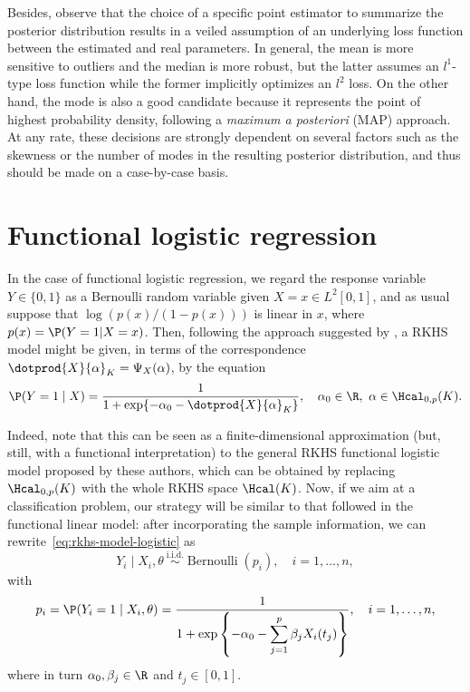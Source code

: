Besides, observe that the choice of a specific point estimator to summarize the posterior distribution results in a veiled assumption of an underlying loss function between the estimated and real parameters. In general, the mean is more sensitive to outliers and the median is more robust, but the latter assumes an \(l^1\)-type loss function while the former implicitly optimizes an \(l^2\) loss. On the other hand, the mode is also a good candidate because it represents the point of highest probability density, following a \textit{maximum a posteriori} (MAP) approach. At any rate, these decisions are strongly dependent on several factors such as the skewness or the number of modes in the resulting posterior distribution, and thus should be made on a case-by-case basis.

\newpage

\section{Functional logistic regression}\label{sec:rkhs-logistic-model}

In the case of functional logistic regression, we regard the response variable \(Y\in\{0, 1\}\) as a Bernoulli random variable given \(X=x \in L^2[0, 1]\), and as usual suppose that \(\log\left(p(x)/(1-p(x))\right)\) is linear in \(x\), where \(p(x)=\P(Y=1| X=x)\). Then, following the approach  suggested by \citet{berrendero2018functional}, a RKHS model might be given, in terms of the correspondence \(\dotprod{X}{\alpha}_K = \Psi_X(\alpha)\), by the equation
\begin{equation}\label{eq:rkhs-model-logistic}
  \P(Y=1 \mid X) = \frac{1}{1 + \exp\{-\alpha_0 - \dotprod{X}{\alpha}_K\}}, \quad \alpha_0 \in \R, \ \alpha \in \Hcal_{0,p}(K).
\end{equation}

Indeed, note that this can be seen as a finite-dimensional approximation (but, still, with a functional interpretation) to the general RKHS functional logistic model proposed by these authors, which can be obtained by replacing \(\Hcal_{0,p}(K)\) with the whole RKHS space \(\Hcal(K)\). Now, if we aim at a classification problem, our strategy will be similar to that followed in the functional linear model: after incorporating the sample information, we can rewrite~\eqref{eq:rkhs-model-logistic} as
\begin{equation}\label{eq:rkhs-model-logistic-2}
Y_i \mid X_i,\theta \ \stackrel{\text{i.i.d.}}{\sim} \operatorname{Bernoulli}(p_i), \quad i=1,\dots, n,
\end{equation}
with
\begin{equation}\label{eq:rkhs-model-logistic-2-parameter}
  p_i = \P(Y_i=1 \mid X_i,\theta) = \frac{1}{\displaystyle 1 + \exp\left\{-\alpha_0 - \sum_{j=1}^p \beta_j X_i(t_j)\right\}}, \quad i=1,\dots, n,
\end{equation}
where in turn \(\alpha_0, \beta_j\in\R\) and \(t_j\in[0, 1]\).

